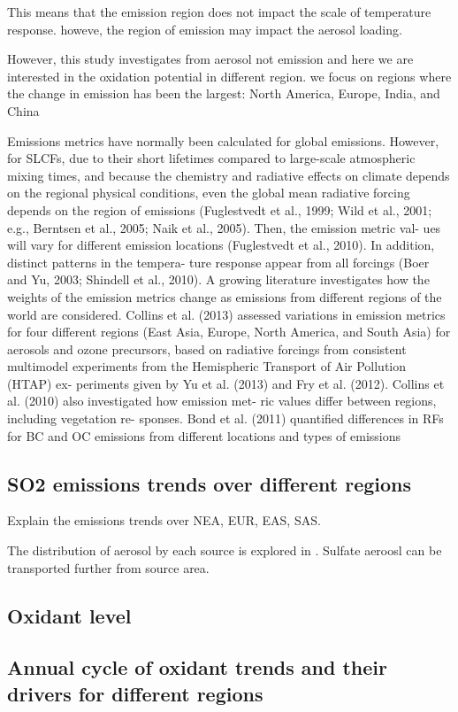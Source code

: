 This means that the emission region does not impact the scale of temperature response. howeve, the region of emission may impact the aerosol loading.

However, this study investigates from aerosol not emission and here we are interested in the oxidation potential in different region. we focus on regions where the change in emission has been the largest: North America, Europe, India, and China



Emissions metrics have normally been calculated for
global emissions. However, for SLCFs, due to their short
lifetimes compared to large-scale atmospheric mixing times,
and because the chemistry and radiative effects on climate
depends on the regional physical conditions, even the global
mean radiative forcing depends on the region of emissions
(Fuglestvedt et al., 1999; Wild et al., 2001; e.g., Berntsen et
al., 2005; Naik et al., 2005). Then, the emission metric val-
ues will vary for different emission locations (Fuglestvedt
et al., 2010). In addition, distinct patterns in the tempera-
ture response appear from all forcings (Boer and Yu, 2003;
Shindell et al., 2010). A growing literature investigates how
the weights of the emission metrics change as emissions
from different regions of the world are considered. Collins
et al. (2013) assessed variations in emission metrics for four
different regions (East Asia, Europe, North America, and
South Asia) for aerosols and ozone precursors, based on
radiative forcings from consistent multimodel experiments
from the Hemispheric Transport of Air Pollution (HTAP) ex-
periments given by Yu et al. (2013) and Fry et al. (2012).
Collins et al. (2010) also investigated how emission met-
ric values differ between regions, including vegetation re-
sponses. Bond et al. (2011) quantified differences in RFs for
BC and OC emissions from different locations and types of
emissions

\subsection{SO2 emissions trends over different regions}



Explain the emissions trends over NEA, EUR, EAS, SAS. 

The distribution of aerosol by each source is explored in \citet{yangGlobalSourceAttribution2017}. Sulfate aeroosl can be transported further from source area.

\subsection{Oxidant level}

\subsection{Annual cycle of oxidant trends and their drivers for different regions}


